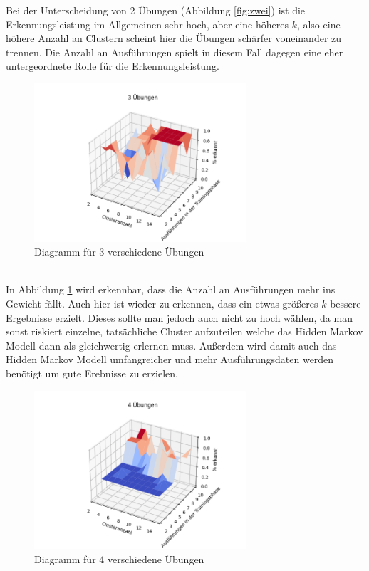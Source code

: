 \documentclass{article}
\begin{document}
Bei der Unterscheidung von 2 Übungen (Abbildung \ref{fig:zwei}) ist die Erkennungsleistung im Allgemeinen sehr hoch, aber eine höheres $k$, also eine höhere Anzahl an Clustern scheint hier die Übungen schärfer voneinander zu trennen.
Die Anzahl an Ausführungen spielt in diesem Fall dagegen eine eher untergeordnete Rolle für die Erkennungsleistung.
\medskip
\begin{figure}[h]
\centering
\includegraphics[width=0.7\textwidth]{figures/3_graph.png}
\caption{Diagramm für 3 verschiedene Übungen}
\label{fig:drei}
\end{figure}\\
In Abbildung \ref{fig:drei} wird erkennbar, dass die Anzahl an Ausführungen mehr ins Gewicht fällt.
Auch hier ist wieder zu erkennen, dass ein etwas größeres $k$ bessere Ergebnisse erzielt.
Dieses sollte man jedoch auch nicht zu hoch wählen, da man sonst riskiert einzelne, tatsächliche Cluster aufzuteilen welche das Hidden Markov Modell dann als gleichwertig erlernen muss.
Außerdem wird damit auch das Hidden Markov Modell umfangreicher und mehr Ausführungsdaten werden benötigt um gute Erebnisse zu erzielen.\\
\medskip
\begin{figure}[htbp]
\centering
\includegraphics[width=0.7\textwidth]{figures/4_graph.png}
\caption{Diagramm für 4 verschiedene Übungen}
\label{fig:vier}
\end{figure}\\
\end{document}
